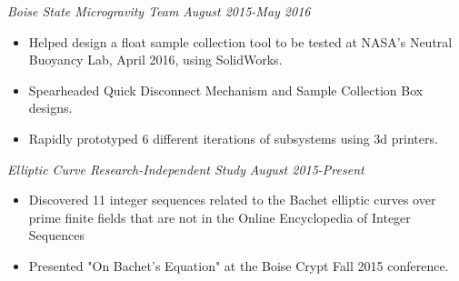 \documentclass[letterpaper]{article}
\begin{document}
\vspace{.10in}
\begin{multicols}{2}
\textit{Boise State Microgravity Team}
\vfill
\columnbreak
\textit{August 2015-May 2016}
\end{multicols}
\begin{itemize}
    \item Helped design a float sample collection tool to be tested at NASA's Neutral Buoyancy Lab, April 2016, using SolidWorks.
    \item Spearheaded Quick Disconnect Mechanism and Sample Collection Box designs. 
	\item Rapidly prototyped 6 different iterations of subsystems using 3d printers.
\end{itemize}

\vspace{.10in}
\begin{multicols}{2}
\textit{Elliptic Curve Research-Independent Study}
\vfill
\columnbreak
\textit{August 2015-Present}
\end{multicols}
\begin{itemize}
    \item Discovered 11 integer sequences related to the Bachet elliptic curves over prime finite fields that are not in the Online Encyclopedia of Integer Sequences
    \item Presented "On Bachet's Equation" at the Boise Crypt Fall 2015 conference.
\end{itemize}
\end{document}
